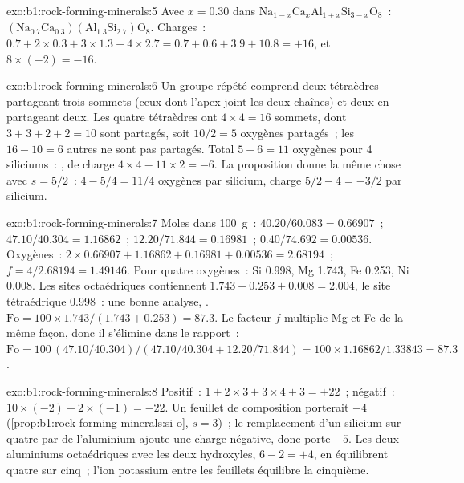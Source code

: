 \begin{solution}{exo:b1:rock-forming-minerals:5}
Avec $x = 0.30$ dans $\mathrm{Na}_{1-x}\mathrm{Ca}_x\mathrm{Al}_{1+x}\mathrm{Si}_{3-x}\mathrm{O}_8$~:
$\mathrm{(Na_{0.7}Ca_{0.3})(Al_{1.3}Si_{2.7})O_8}$. Charges~:
$0.7 + 2\times0.3 + 3\times1.3 + 4\times2.7 = 0.7 + 0.6 + 3.9 + 10.8 = +16$,
et $8\times(-2) = -16$.
\end{solution}

\begin{solution}{exo:b1:rock-forming-minerals:6}
Un groupe répété comprend deux tétraèdres partageant trois sommets (ceux dont
l'apex joint les deux chaînes) et deux en partageant deux. Les quatre tétraèdres
ont $4\times4 = 16$ sommets, dont $3 + 3 + 2 + 2 = 10$ sont partagés, soit
$10/2 = 5$ oxygènes partagés~; les $16 - 10 = 6$ autres ne sont pas partagés.
Total $5 + 6 = 11$ oxygènes pour 4 siliciums~: , de charge
$4\times4 - 11\times2 = -6$. La proposition donne la même chose avec
$s = 5/2$~: $4 - 5/4 = 11/4$ oxygènes par silicium, charge $5/2 - 4 = -3/2$ par
silicium.
\end{solution}

\begin{solution}{exo:b1:rock-forming-minerals:7}
Moles dans \qty{100}{g}~:  $40.20/60.083 = 0.66907$~; 
$47.10/40.304 = 1.16862$~;  $12.20/71.844 = 0.16981$~; 
$0.40/74.692 = 0.00536$. Oxygènes~: $2\times0.66907 + 1.16862 + 0.16981 +
0.00536 = 2.68194$~; $f = 4/2.68194 = 1.49146$. Pour quatre oxygènes~: Si
\num{0.998}, Mg \num{1.743}, Fe \num{0.253}, Ni \num{0.008}. Les sites
octaédriques contiennent $1.743 + 0.253 + 0.008 = 2.004$, le site tétraédrique
\num{0.998}~: une bonne analyse, .
$\mathrm{Fo} = 100\times1.743/(1.743 + 0.253) = 87.3$. Le facteur $f$
multiplie Mg et Fe de la même façon, donc il s'élimine dans le rapport~:
$\mathrm{Fo} = 100\,(47.10/40.304)/(47.10/40.304 + 12.20/71.844) =
100\times1.16862/1.33843 = 87.3$.
\end{solution}

\begin{solution}{exo:b1:rock-forming-minerals:8}
Positif~: $1 + 2\times3 + 3\times4 + 3 = +22$~; négatif~:
$10\times(-2) + 2\times(-1) = -22$. Un feuillet de composition 
porterait $-4$ (\cref{prop:b1:rock-forming-minerals:si-o}, $s = 3$)~; le
remplacement d'un silicium sur quatre par de l'aluminium ajoute une charge
négative, donc  porte $-5$. Les deux aluminiums octaédriques avec
les deux hydroxyles, $6 - 2 = +4$, en équilibrent quatre sur cinq~; l'ion
potassium entre les feuillets équilibre la cinquième.
\end{solution}

